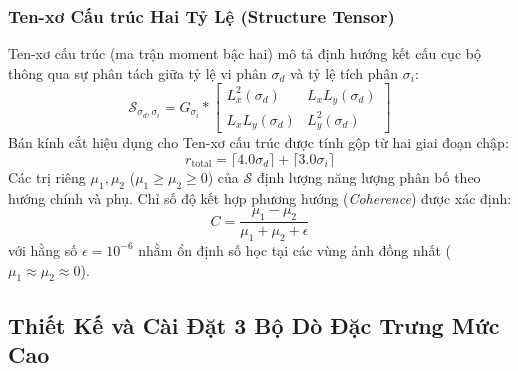 \documentclass[conference]{IEEEtran}
\begin{document}
\subsubsection{Ten-xơ Cấu trúc Hai Tỷ Lệ (Structure Tensor)}
Ten-xơ cấu trúc (ma trận moment bậc hai) mô tả định hướng kết cấu cục bộ thông qua sự phân tách giữa tỷ lệ vi phân $\sigma_d$ và tỷ lệ tích phân $\sigma_i$:
\begin{equation}
\mathcal{S}_{\sigma_d, \sigma_i} = G_{\sigma_i} * \begin{bmatrix} L_x^2(\sigma_d) & L_x L_y(\sigma_d) \\ L_x L_y(\sigma_d) & L_y^2(\sigma_d) \end{bmatrix}
\end{equation}
Bán kính cắt hiệu dụng cho Ten-xơ cấu trúc được tính gộp từ hai giai đoạn chập:
\begin{equation}
r_{\text{total}} = \lceil 4.0 \sigma_d \rceil + \lceil 3.0 \sigma_i \rceil
\end{equation}
Các trị riêng $\mu_1, \mu_2$ ($\mu_1 \ge \mu_2 \ge 0$) của $\mathcal{S}$ định lượng năng lượng phân bố theo hướng chính và phụ. Chỉ số độ kết hợp phương hướng (\textit{Coherence}) được xác định:
\begin{equation}
C = \frac{\mu_1 - \mu_2}{\mu_1 + \mu_2 + \epsilon}
\end{equation}
với hằng số $\epsilon = 10^{-6}$ nhằm ổn định số học tại các vùng ảnh đồng nhất ($\mu_1 \approx \mu_2 \approx 0$).

\subsection{Thiết Kế và Cài Đặt 3 Bộ Dò Đặc Trưng Mức Cao}
\end{document}
